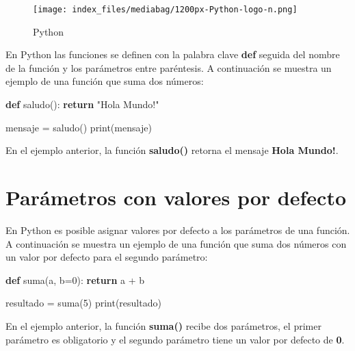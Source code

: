 \documentclass[
  a4paper,
  DIV=11,
  numbers=noendperiod,
  onepage,
  openany]{scrreprt}
\newenvironment{Shaded}{\begin{snugshade}}{\end{snugshade}}
\newcommand{\BuiltInTok}[1]{\textcolor[rgb]{0.00,0.23,0.31}{#1}}
\newcommand{\ControlFlowTok}[1]{\textcolor[rgb]{0.00,0.23,0.31}{\textbf{#1}}}
\newcommand{\DecValTok}[1]{\textcolor[rgb]{0.68,0.00,0.00}{#1}}
\newcommand{\KeywordTok}[1]{\textcolor[rgb]{0.00,0.23,0.31}{\textbf{#1}}}
\newcommand{\NormalTok}[1]{\textcolor[rgb]{0.00,0.23,0.31}{#1}}
\newcommand{\OperatorTok}[1]{\textcolor[rgb]{0.37,0.37,0.37}{#1}}
\newcommand{\StringTok}[1]{\textcolor[rgb]{0.13,0.47,0.30}{#1}}
\begin{document}
\begin{figure}[H]

{\centering \texttt{[image: index\_files/mediabag/1200px-Python-logo-n.png]}

}

\caption{Python}

\end{figure}%

En Python las funciones se definen con la palabra clave \textbf{def}
seguida del nombre de la función y los parámetros entre paréntesis. A
continuación se muestra un ejemplo de una función que suma dos números:

\begin{Shaded}
\begin{Highlighting}[]
\KeywordTok{def}\NormalTok{ saludo():}
    \ControlFlowTok{return} \StringTok{"Hola Mundo!"}

\NormalTok{mensaje }\OperatorTok{=}\NormalTok{ saludo()}
\BuiltInTok{print}\NormalTok{(mensaje)}
\end{Highlighting}
\end{Shaded}

En el ejemplo anterior, la función \textbf{saludo()} retorna el mensaje
\textbf{Hola Mundo!}.

\section{Parámetros con valores por
defecto}\label{paruxe1metros-con-valores-por-defecto}

En Python es posible asignar valores por defecto a los parámetros de una
función. A continuación se muestra un ejemplo de una función que suma
dos números con un valor por defecto para el segundo parámetro:

\begin{Shaded}
\begin{Highlighting}[]
\KeywordTok{def}\NormalTok{ suma(a, b}\OperatorTok{=}\DecValTok{0}\NormalTok{):}
    \ControlFlowTok{return}\NormalTok{ a }\OperatorTok{+}\NormalTok{ b}

\NormalTok{resultado }\OperatorTok{=}\NormalTok{ suma(}\DecValTok{5}\NormalTok{)}
\BuiltInTok{print}\NormalTok{(resultado)}
\end{Highlighting}
\end{Shaded}

En el ejemplo anterior, la función \textbf{suma()} recibe dos
parámetros, el primer parámetro es obligatorio y el segundo parámetro
tiene un valor por defecto de \textbf{0}.
\end{document}
